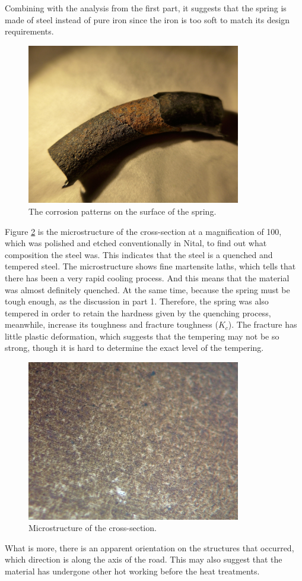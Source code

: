 \documentclass[11pt]{article}
\begin{document}
Combining with the analysis from the first part, it suggests that the spring is made of steel instead of pure iron since the iron is too soft to match its design requirements.  
\begin{figure}[H]
    \centering
    \includegraphics[height = 7cm]{./img/rust1.jpeg}
    \caption{The corrosion patterns on the surface of the spring.}
    \label{fig:rust1}
\end{figure}
Figure \ref{fig:microstructure3} is the microstructure of the cross-section at a magnification of 100, which was polished and etched conventionally in Nital, to find out what composition the steel was. This indicates that the steel is a quenched and tempered steel. The microstructure shows fine martensite laths, which tells that there has been a very rapid cooling process. And this means that the material was almost definitely quenched. At the same time, because the spring must be tough enough, as the discussion in part 1. Therefore, the spring was also tempered in order to retain the hardness given by the quenching process, meanwhile, increase its toughness and fracture toughness ($K_c$). The fracture has little plastic deformation, which suggests that the tempering may not be so strong, though it is hard to determine the exact level of the tempering. 
\begin{figure}[H]
    \centering
    \includegraphics[height = 7cm]{./img/microstructure2.jpeg}
    \caption{Microstructure of the cross-section.}
    \label{fig:microstructure3}
\end{figure}
What is more, there is an apparent orientation on the structures that occurred, which direction is along the axis of the road. This may also suggest that the material has undergone other hot working before the heat treatments. 
\end{document}
